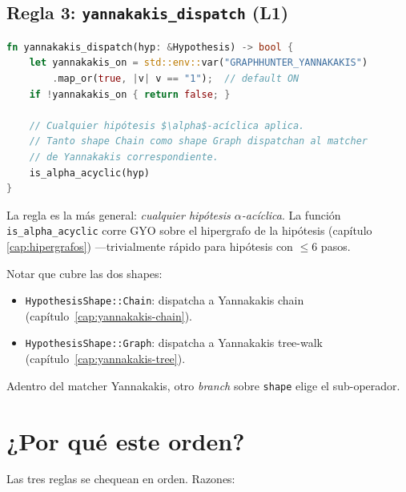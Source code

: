 \subsection{Regla 3: \texttt{yannakakis\_dispatch} (L1)}

\begin{lstlisting}[language=Rust]
fn yannakakis_dispatch(hyp: &Hypothesis) -> bool {
    let yannakakis_on = std::env::var("GRAPHHUNTER_YANNAKAKIS")
        .map_or(true, |v| v == "1");  // default ON
    if !yannakakis_on { return false; }

    // Cualquier hipótesis $\alpha$-acíclica aplica.
    // Tanto shape Chain como shape Graph dispatchan al matcher
    // de Yannakakis correspondiente.
    is_alpha_acyclic(hyp)
}
\end{lstlisting}

\noindent
La regla es la más general: \emph{cualquier hipótesis
\(\alpha\)-acíclica}. La función \texttt{is\_alpha\_acyclic} corre
GYO sobre el hipergrafo de la hipótesis (capítulo
\ref{cap:hipergrafos}) ---trivialmente rápido para hipótesis con
\(\leq 6\) pasos.

Notar que cubre las dos shapes:
\begin{itemize}
    \item \texttt{HypothesisShape::Chain}: dispatcha a Yannakakis
    chain (capítulo~\ref{cap:yannakakis-chain}).
    \item \texttt{HypothesisShape::Graph}: dispatcha a Yannakakis
    tree-walk (capítulo~\ref{cap:yannakakis-tree}).
\end{itemize}

\noindent
Adentro del matcher Yannakakis, otro \emph{branch} sobre
\texttt{shape} elige el sub-operador.

\section{¿Por qué este orden?}

Las tres reglas se chequean en orden. Razones:

